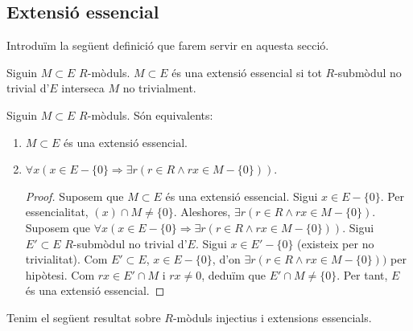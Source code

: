 \subsection{Extensió essencial}
Introduïm la següent definició que farem servir en aquesta secció.
\begin{definicio}
    Siguin $M\subset E$ $R$-mòduls. $M\subset E$ és una extensió essencial si tot $R$-submòdul no trivial d'$E$ interseca $M$ no trivialment.
\end{definicio}
\begin{lema}\label{equivalent-ext-essencial}
    Siguin $M\subset E$ $R$-mòduls. Són equivalents:
    \begin{enumerate}
        \item $M\subset E$ és una extensió essencial.
        \item $\forall x(x\in E-\{0\}\Rightarrow\exists r(r\in R\land rx\in M-\{0\}))$.
        \begin{proof}
            Suposem que $M\subset E$ és una extensió essencial. Sigui $x\in E-\{0\}$. Per essencialitat, $(x)\cap M\neq\{0\}$. Aleshores, $\exists r(r\in R\land rx\in M-\{0\})$.\newline
            Suposem que $\forall x(x\in E-\{0\}\Rightarrow\exists r(r\in R\land rx\in M-\{0\}))$. Sigui $E'\subset E$ $R$-submòdul no trivial d'$E$. Sigui $x\in E'-\{0\}$ (existeix per no trivialitat). Com $E'\subset E$, $x\in E-\{0\}$, d'on $\exists r(r\in R\land rx\in M-\{0\}))$ per hipòtesi. Com $rx\in E'\cap M$ i $rx\neq0$, deduïm que $E'\cap M\neq\{0\}$. Per tant, $E$ és una extensió essencial.
        \end{proof}
    \end{enumerate}
\end{lema}
Tenim el següent resultat sobre $R$-mòduls injectius i extensions essencials.
